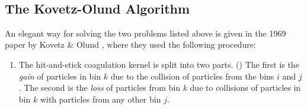      \\


    \clearpage\subsection{The Kovetz-Olund Algorithm}
        
        An elegant way for solving the two problems listed above is given in the 1969 paper
        by Kovetz \& Olund \cite{kovetz_olund_1969}, where they used the following procedure:
        \begin{enumerate}
            \item The hit-and-stick coagulation kernel is split into two parts. 
                ()
                The first is the \textit{gain} of particles in bin $k$ due to the collision of 
                particles from the bins $i$ and $j$. The second is the \textit{loss} of particles 
                from bin $k$ due to collisions of particles in bin $k$ with particles from any 
                other bin $j$.
            

\end{enumerate}
